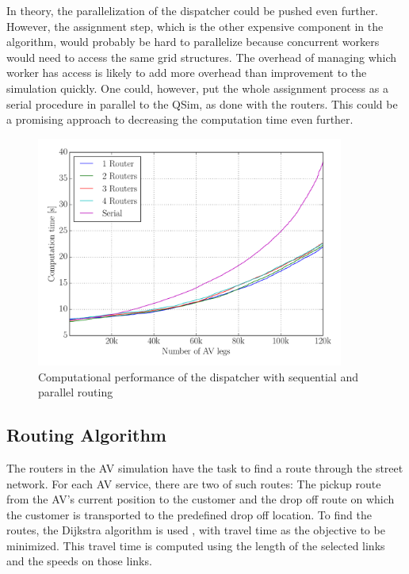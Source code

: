 In theory, the parallelization of the dispatcher could be pushed even further.
However, the assignment step, which is the other expensive component in the algorithm,
would probably be hard to parallelize because concurrent workers
would need to access the same grid structures. The overhead of managing which
worker has access is likely to add more overhead than improvement to
the simulation quickly. One could, however, put the whole assignment process as a serial
procedure in parallel to the QSim, as done with the routers. This could be a
promising approach to decreasing the computation time even further.

\begin{figure}
    \centering
    \includegraphics[width=0.9\textwidth]{figures/routers.pdf}
    \caption{Computational performance of the dispatcher with sequential and parallel routing}
    \label{fig:routers}
\end{figure}

\subsection{Routing Algorithm}
\label{sec:routing}

The routers in the AV simulation have the task to find a route through the street
network. For each AV service, there are two of such routes: The pickup route from
the AV's current position to the customer and the drop off route on which the customer
is transported to the predefined drop off location. To find the routes, the Dijkstra algorithm is used \citep{Dijkstra}, with
travel time as the objective to be minimized. This travel time is computed using
the length of the selected links and the speeds on those links.

